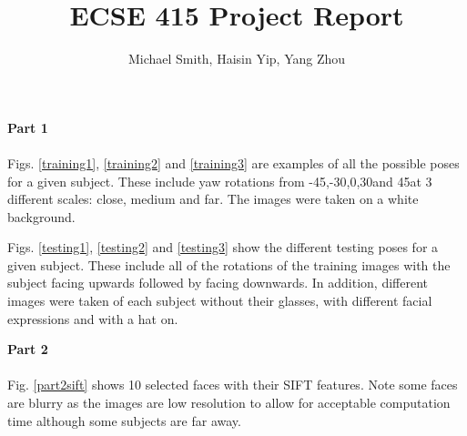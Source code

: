 \documentclass[10pt,letterpaper]{article}
\author{Michael Smith, Haisin Yip, Yang Zhou}
\title{ECSE 415 Project Report}
\begin{document}
\maketitle

\textbf{Part 1}
\paragraph{}
Figs. \ref{training1}, \ref{training2} and \ref{training3} are examples of all the possible poses for a given subject.  These include yaw rotations from -45\degree,-30\degree,0\degree,30\degree and 45\degree at 3 different scales: close, medium and far.  The images were taken on a white background.

Figs. \ref{testing1}, \ref{testing2} and \ref{testing3} show the different testing poses for a given subject.  These include all of the rotations of the training images with the subject facing upwards followed by facing downwards.  In addition, different images were taken of each subject without their glasses, with different facial expressions and with a hat on.

\vspace{5mm}
\textbf{Part 2}
\paragraph{}
Fig. \ref{part2sift} shows 10 selected faces with their SIFT features. Note some faces are blurry as the images are low resolution to allow for acceptable computation time although some subjects are far away.
\end{document}
